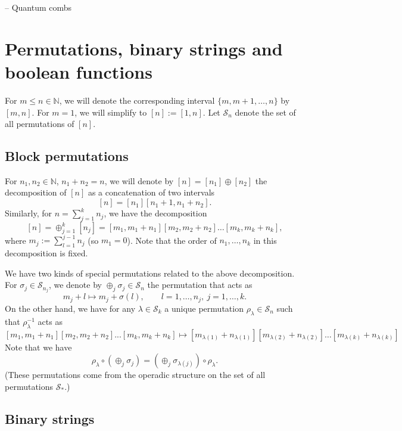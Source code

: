 \documentclass[12pt]{article}
\theoremstyle{definition}
\theoremstyle{remark}
\def\permut{\mathscr{S}}
\begin{document}
-- Quantum combs


\appendix


\section{Permutations, binary strings and boolean functions}

For $m\le n\in \mathbb N$, we will denote the corresponding interval $\{m,m+1,\dots,n\}$ by
$[m,n]$. For $m=1$, we will simplify to  $[n]:=[1,n]$. Let $\permut_n$ denote the set of all permutations of $[n]$.


\subsection{Block permutations}
\label{sec:permut}


 For $n_1,n_2\in \mathbb N$, $n_1+n_2=n$, 
we will denote by $[n]=[n_1]\oplus [n_2]$ the decomposition of $[n]$ as a concatenation of two 
intervals
\[
[n]=[n_1][n_1+1,n_1+n_2].
\]
Similarly, for $n=\sum_{j=1}^kn_j$, we have the decomposition
\[
[n]=\oplus_{j=1}^k[n_j]=[m_1,m_1+n_1][m_2,m_2+n_2]\dots[m_k,m_k+n_k],
\]
where $m_j:=\sum_{l=1}^{j-1} n_j$ (so $m_1=0$). Note that the order of $n_1,\dots, n_k$ in
this decomposition is
fixed. 

We have two kinds of special permutations related to the above decomposition. For
$\sigma_j\in \permut_{n_j}$, we denote by $\oplus_j \sigma_j\in \permut_n$ the permutation that acts as
\[
m_j+l\mapsto m_j+\sigma(l),\qquad l=1,\dots,n_j,\ j=1,\dots, k. 
\]
On the other hand, we have for any $\lambda\in \permut_k$ a unique permutation
$\rho_\lambda\in\permut_n$  such that $\rho_\lambda^{-1}$ acts as
\[
[m_1,m_1+n_1][m_2,m_2+n_2]...[m_k,m_k+n_k]\mapsto
[m_{\lambda(1)}+n_{\lambda(1)}][m_{\lambda(2)}+n_{\lambda(2)}]\dots[m_{\lambda(k)}+n_{\lambda(k)}]
\]
Note that we have
\[
\rho_\lambda\circ(\oplus_j\sigma_j)=(\oplus_j \sigma_{\lambda(j)})\circ\rho_\lambda.
\]
(These permutations  come from the operadic structure on the set of
all permutations $\permut_*$.)


\subsection{Binary strings}
\end{document}
